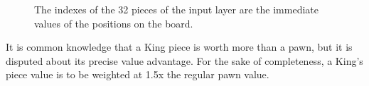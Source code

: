 \documentclass[12pt,a4paper]{article}
\newcommand{\bl}{\node [ball, ball color=black!80!white, draw=black!65!white, thin]{};}
\newcommand{\wh}{\node [ball, ball color=white] {};}
\begin{document}
    \begin{figure}
        \centering
            \caption{The indexes of the 32 pieces of the input layer are the immediate values of the positions on the board. \label{boardarray}}
    
      
    \end{figure}
    
    It is common knowledge that a King piece is worth more than a pawn, but it is disputed about its precise value advantage. For the sake of completeness, a King's piece value is to be weighted at 1.5x the regular pawn value. 
\end{document}
